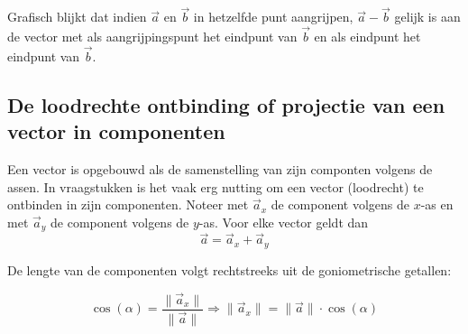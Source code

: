 \documentclass{ximera}
\begin{document}
\begin{image}[0.5\textwidth]
\end{image}

Grafisch blijkt dat indien \(\vec{a}\) en \(\vec{b}\) in hetzelfde punt aangrijpen, \(\vec{a} - \vec{b}\) gelijk is aan de vector met als aangrijpingspunt het eindpunt van \(\vec{b}\) en als eindpunt het eindpunt van \(\vec{b}\).

\subsection*{De loodrechte ontbinding of projectie van een vector in componenten}



Een vector is opgebouwd als de samenstelling van zijn componten volgens de assen.  
In vraagstukken is het vaak erg nutting om een vector (loodrecht) te ontbinden in zijn componenten. 
Noteer met \(\vec{a}_x\) de component volgens de \(x\)-as en met \(\vec{a}_y\) de component volgens de \(y\)-as. 
Voor elke vector geldt dan 
\[
\vec{a} = \vec{a}_x + \vec{a}_y
\]

De lengte van de componenten volgt rechtstreeks uit de goniometrische getallen: 

\[
\cos(\alpha) = \frac{\| \vec{a}_x \|}{\| \vec{a} \|} \Rightarrow \| \vec{a}_x \| = \|\vec{a}\| \cdot \cos(\alpha)
\]
\end{document}
